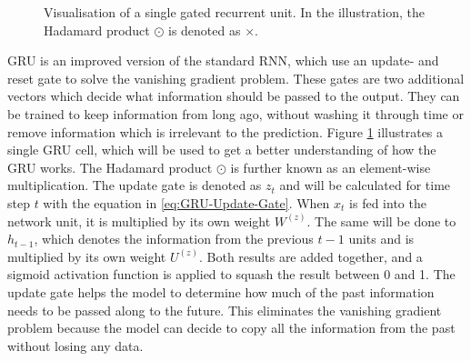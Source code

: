 \begin{figure}[htbp]
    \caption[Visualisation of a single gated recurrent unit]{Visualisation of a single gated recurrent unit. In the illustration, the Hadamard product $\odot$ is denoted as $\times$.}
    \label{fig:GRU-Visualisation}
\end{figure}
\noindent
\gls{GRU} is an improved version of the standard \gls{RNN}, which use an update- and reset gate to solve the vanishing gradient problem. These gates are two additional vectors which decide what information should be passed to the output. They can be trained to keep information from long ago, without washing it through time or remove information which is irrelevant to the prediction. Figure \ref{fig:GRU-Visualisation} illustrates a single \gls{GRU} cell, which will be used to get a better understanding of how the \gls{GRU} works. The Hadamard product $\odot$ is further known as an element-wise multiplication.
\newline
\newline
The update gate is denoted as $z_t$ and will be calculated for time step $t$ with the equation in \ref{eq:GRU-Update-Gate}. When $x_t$ is fed into the network unit, it is multiplied by its own weight $W^{(z)}$. The same will be done to $h_{t-1}$, which denotes the information from the previous $t-1$ units and is multiplied by its own weight $U^{(z)}$. Both results are added together, and a sigmoid activation function is applied to squash the result between 0 and 1. The update gate helps the model to determine how much of the past information needs to be passed along to the future. This eliminates the vanishing gradient problem because the model can decide to copy all the information from the past without losing any data.
